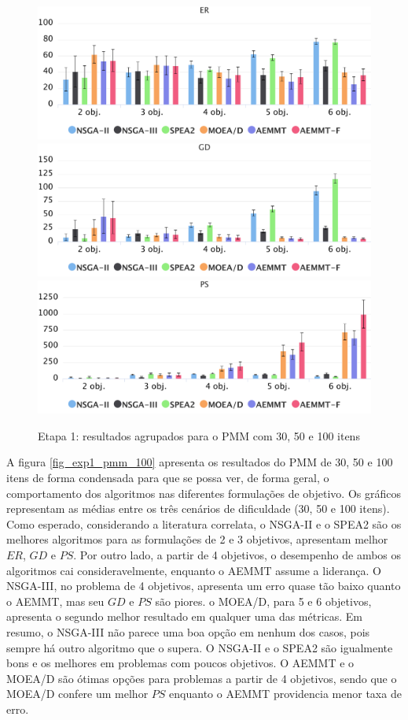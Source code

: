 \begin{figure}[!htbp]
	\caption{Etapa 1: resultados agrupados para o PMM com 30, 50 e 100 itens}
	\label{fig_exp1_pmm_todos}
	\includegraphics[width=1\textwidth]{cap_experimentos/figs/etapa1/er-mkp-todos}
	\includegraphics[width=1\textwidth]{cap_experimentos/figs/etapa1/gd-mkp-todos}
	\includegraphics[width=1\textwidth]{cap_experimentos/figs/etapa1/ps-mkp-todos}
\end{figure}

A figura \ref{fig_exp1_pmm_100} apresenta os resultados do PMM de 30, 50 e 100 itens de forma condensada para que se possa ver, de forma geral, o comportamento dos algoritmos nas diferentes formulações de objetivo. Os gráficos representam as médias entre os três cenários de dificuldade (30, 50 e 100 itens). Como esperado, considerando a literatura correlata, o NSGA-II e o SPEA2 são os melhores algoritmos para as formulações de 2 e 3 objetivos, apresentam melhor $ER$, $GD$ e $PS$. Por outro lado, a partir de 4 objetivos, o desempenho de ambos os algoritmos cai consideravelmente, enquanto o AEMMT assume a liderança. O NSGA-III, no problema de 4 objetivos, apresenta um erro quase tão baixo quanto o AEMMT, mas seu $GD$ e $PS$ são piores. o MOEA/D, para 5 e 6 objetivos, apresenta o segundo melhor resultado em qualquer uma das métricas. Em resumo, o NSGA-III não parece uma boa opção em nenhum dos casos, pois sempre há outro algoritmo que o supera. O NSGA-II e o SPEA2 são igualmente bons e os melhores em problemas com poucos objetivos. O AEMMT e o MOEA/D são ótimas opções para problemas a partir de 4 objetivos, sendo que o MOEA/D confere um melhor $PS$ enquanto o AEMMT providencia menor taxa de erro.

